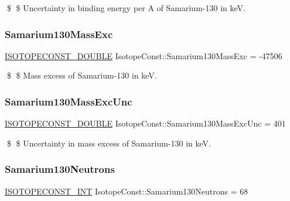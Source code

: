 \$ \$ Uncertainty in binding energy per A of Samarium-\/130 in keV. \mbox{\label{group___isotope_const-_samarium-_sm130_ga8acb4e894714429ab28448a868153be6}} 
\subsubsection{\texorpdfstring{Samarium130\+Mass\+Exc}{Samarium130MassExc}}
{\footnotesize\ttfamily \mbox{\hyperlink{group___isotope_const-_macros_ga8f45a7272ce02c0b4c65c44636ed719a}{I\+S\+O\+T\+O\+P\+E\+C\+O\+N\+S\+T\+\_\+\+D\+O\+U\+B\+LE}} Isotope\+Const\+::\+Samarium130\+Mass\+Exc = -\/47506}

\$ \$ Mass excess of Samarium-\/130 in keV. \mbox{\label{group___isotope_const-_samarium-_sm130_ga3c32cf6b6b8a8405264025953e785231}} 
\subsubsection{\texorpdfstring{Samarium130\+Mass\+Exc\+Unc}{Samarium130MassExcUnc}}
{\footnotesize\ttfamily \mbox{\hyperlink{group___isotope_const-_macros_ga8f45a7272ce02c0b4c65c44636ed719a}{I\+S\+O\+T\+O\+P\+E\+C\+O\+N\+S\+T\+\_\+\+D\+O\+U\+B\+LE}} Isotope\+Const\+::\+Samarium130\+Mass\+Exc\+Unc = 401}

\$ \$ Uncertainty in mass excess of Samarium-\/130 in keV. \mbox{\label{group___isotope_const-_samarium-_sm130_ga086ab9cfa5cd38a36b9eb89eff6ea7e4}} 
\subsubsection{\texorpdfstring{Samarium130\+Neutrons}{Samarium130Neutrons}}
{\footnotesize\ttfamily \mbox{\hyperlink{group___isotope_const-_macros_ga5f18360b3e99483a35c32d789e62621c}{I\+S\+O\+T\+O\+P\+E\+C\+O\+N\+S\+T\+\_\+\+I\+NT}} Isotope\+Const\+::\+Samarium130\+Neutrons = 68}

